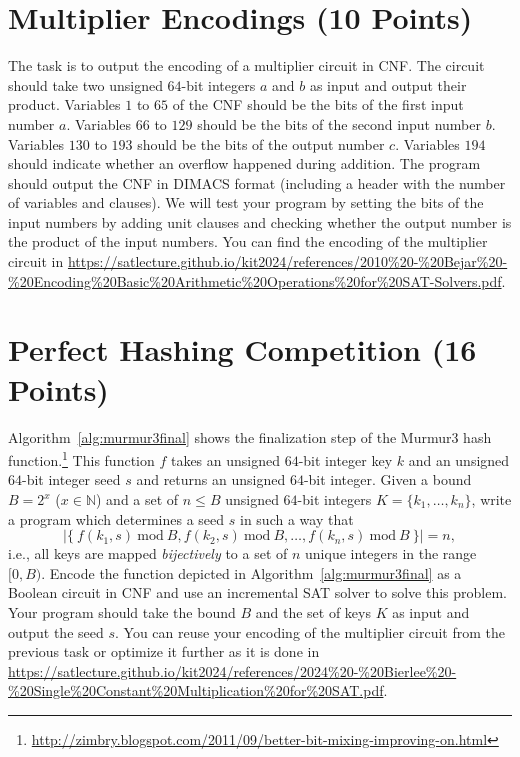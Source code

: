 \documentclass{article}
\begin{document}
\vspace*{-1em}

\section{Multiplier Encodings (10 Points)}

The task is to output the encoding of a multiplier circuit in CNF.
The circuit should take two unsigned $64$-bit integers $a$ and $b$ as input and output their product.
Variables $1$ to $65$ of the CNF should be the bits of the first input number $a$.
Variables $66$ to $129$ should be the bits of the second input number $b$.
Variables $130$ to $193$ should be the bits of the output number $c$.
Variables $194$ should indicate whether an overflow happened during addition.
The program should output the CNF in DIMACS format (including a header with the number of variables and clauses).
We will test your program by setting the bits of the input numbers by adding unit clauses and checking whether the output number is the product of the input numbers.
You can find the encoding of the multiplier circuit in \url{https://satlecture.github.io/kit2024/references/2010%20-%20Bejar%20-%20Encoding%20Basic%20Arithmetic%20Operations%20for%20SAT-Solvers.pdf}.

\section{Perfect Hashing Competition (16 Points)}

Algorithm~\ref{alg:murmur3final} shows the finalization step of the Murmur3 hash function.\footnote{\url{http://zimbry.blogspot.com/2011/09/better-bit-mixing-improving-on.html}}
This function $f$ takes an unsigned $64$-bit integer key $k$ and an unsigned $64$-bit integer seed $s$ and returns an unsigned $64$-bit integer.
Given a bound $B = 2^x$ ($x \in \mathbb{N}$) and a set of $n \leq B$ unsigned $64$-bit integers $K = \{k_1, \ldots, k_n\}$, write a program which determines a seed $s$ in such a way that
\[|\{\ f(k_1,s)\ \textrm{mod}\ B, f(k_2,s)\ \textrm{mod}\ B, \ldots, f(k_n,s)\ \textrm{mod}\ B\ \}| = n,\] i.e., all keys are mapped \emph{bijectively} to a set of $n$ unique integers in the range $[0, B)$.
Encode the function depicted in Algorithm~\ref{alg:murmur3final} as a Boolean circuit in CNF and use an incremental SAT solver to solve this problem.
Your program should take the bound $B$ and the set of keys $K$ as input and output the seed $s$.
You can reuse your encoding of the multiplier circuit from the previous task or optimize it further as it is done in \url{https://satlecture.github.io/kit2024/references/2024%20-%20Bierlee%20-%20Single%20Constant%20Multiplication%20for%20SAT.pdf}.
\end{document}
